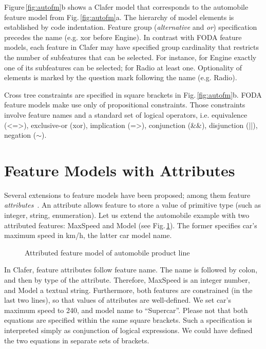 \documentclass{llncs}
\newcommand{\figref}[1]{Fig.\,\ref{fig:#1}}
\newcommand{\Figref}[1]{Figure\,\ref{fig:#1}}
\begin{document}
\Figref{autofm}b shows a Clafer model that corresponds to the automobile feature model from \figref{autofm}a. The hierarchy of model elements is established by code indentation. Feature group (\emph{alternative} and \emph{or}) specification precedes the name (e.g. \textsf{xor} before \textsf{Engine}). In contrast with FODA feature models, each feature in Clafer may have specified group cardinality that restricts the number of subfeatures that can be selected. For instance, for \textsf{Engine} exactly one of its subfeatures can be selected; for \textsf{Radio} at least one. Optionality of elements is marked by the question mark following the name (e.g. \textsf{Radio}).

Cross tree constraints are specified in square brackets in \figref{autofm}b. FODA feature models make use only of propositional constraints. Those constraints involve feature names and a standard set of logical operators, i.e. equivalence (\textsf{<=>}), exclusive-or (\textsf{xor}), implication (\textsf{=>}), conjunction (\textsf{\&\&}), disjunction (\textsf{||}), negation (\textsf{$\sim$}).

\section{Feature Models with Attributes}

Several extensions to feature models have been proposed; among them feature \emph{attributes}~\cite{benavides:fama:2005}. An attribute allows feature to store a value of primitive type (such as integer, string, enumeration). Let us extend the automobile example with two attributed features: \textsf{MaxSpeed} and \textsf{Model} (see \figref{aautofm}). The former specifies car's maximum speed in km/h, the latter car model name.

\begin{figure}[t]
  \begin{center}
    
  \end{center}
  \caption{Attributed feature model of automobile product line\label{fig:aautofm}}
\end{figure}

In Clafer, feature attributes follow feature name. The name is followed by colon, and then by type of the attribute. Therefore, \textsf{MaxSpeed} is an integer number, and \textsf{Model} a textual string. Furthermore, both features are constrained (in the last two lines), so that values of attributes are well-defined. We set car's maximum speed to 240, and model name to ``Supercar''. Please not that both equations are specified within the same square brackets. Such a specification is interpreted simply as conjunction of logical expressions. We could have defined the two equations in separate sets of brackets.
\end{document}
